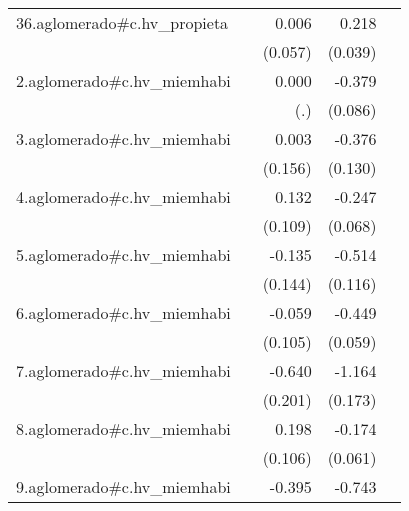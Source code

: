 {\begin{longtable}{l*{4}{D{.}{.}{-1}}}
\addlinespace
36.aglomerado#c.hv\_propieta&                     &       0.006         &       0.218\sym{***}&                     \\
            &                     &     (0.057)         &     (0.039)         &                     \\
\addlinespace
2.aglomerado#c.hv\_miemhabi&                     &       0.000         &      -0.379\sym{***}&                     \\
            &                     &         (.)         &     (0.086)         &                     \\
\addlinespace
3.aglomerado#c.hv\_miemhabi&                     &       0.003         &      -0.376\sym{**} &                     \\
            &                     &     (0.156)         &     (0.130)         &                     \\
\addlinespace
4.aglomerado#c.hv\_miemhabi&                     &       0.132         &      -0.247\sym{***}&                     \\
            &                     &     (0.109)         &     (0.068)         &                     \\
\addlinespace
5.aglomerado#c.hv\_miemhabi&                     &      -0.135         &      -0.514\sym{***}&                     \\
            &                     &     (0.144)         &     (0.116)         &                     \\
\addlinespace
6.aglomerado#c.hv\_miemhabi&                     &      -0.059         &      -0.449\sym{***}&                     \\
            &                     &     (0.105)         &     (0.059)         &                     \\
\addlinespace
7.aglomerado#c.hv\_miemhabi&                     &      -0.640\sym{**} &      -1.164\sym{***}&                     \\
            &                     &     (0.201)         &     (0.173)         &                     \\
\addlinespace
8.aglomerado#c.hv\_miemhabi&                     &       0.198         &      -0.174\sym{**} &                     \\
            &                     &     (0.106)         &     (0.061)         &                     \\
\addlinespace
9.aglomerado#c.hv\_miemhabi&                     &      -0.395\sym{**} &      -0.743\sym{***}&                     \\

\end{longtable}}
